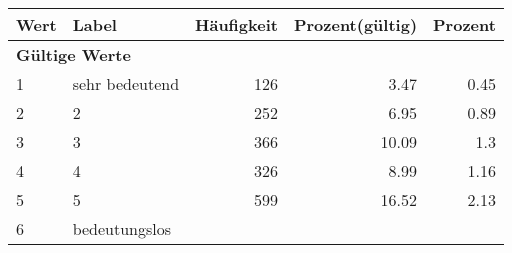      \begin{longtable}{lXrrr}
     \toprule
     \textbf{Wert} & \textbf{Label} & \textbf{Häufigkeit} & \textbf{Prozent(gültig)} & \textbf{Prozent} \\
     \endhead
     \midrule
     \multicolumn{5}{l}{\textbf{Gültige Werte}}\\

     1 &
     \multicolumn{1}{X}{ sehr bedeutend   } &


       \num{126} &
       \num[round-mode=places,round-precision=2]{3,47} &
         \num[round-mode=places,round-precision=2]{0,45} \\

     2 &
     \multicolumn{1}{X}{ 2   } &


       \num{252} &
       \num[round-mode=places,round-precision=2]{6,95} &
         \num[round-mode=places,round-precision=2]{0,89} \\

     3 &
     \multicolumn{1}{X}{ 3   } &


       \num{366} &
       \num[round-mode=places,round-precision=2]{10,09} &
         \num[round-mode=places,round-precision=2]{1,3} \\

     4 &
     \multicolumn{1}{X}{ 4   } &


       \num{326} &
       \num[round-mode=places,round-precision=2]{8,99} &
         \num[round-mode=places,round-precision=2]{1,16} \\

     5 &
     \multicolumn{1}{X}{ 5   } &


       \num{599} &
       \num[round-mode=places,round-precision=2]{16,52} &
         \num[round-mode=places,round-precision=2]{2,13} \\

     6 &
     \multicolumn{1}{X}{ bedeutungslos   } &



\end{longtable}
